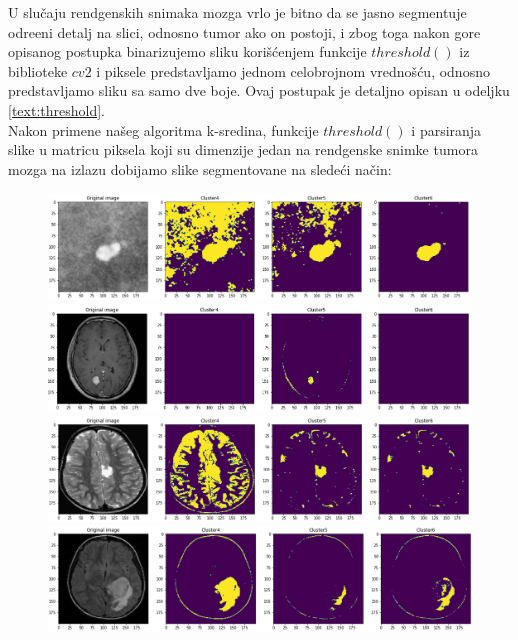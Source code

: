 \documentclass{article}
\begin{document}
U slu\v{c}aju rendgenskih snimaka mozga vrlo je bitno da se jasno segmentuje odre\dj eni detalj na slici, odnosno tumor ako on postoji, i zbog toga nakon gore opisanog postupka binarizujemo sliku kori\v{s}\'{c}enjem funkcije $ threshold() $ iz biblioteke $ cv2 $ i piksele predstavljamo jednom celobrojnom vredno\v{s}\'{c}u, odnosno predstavljamo sliku sa samo dve boje. Ovaj postupak je detaljno opisan u odeljku \ref{text:threshold}.\\


Nakon primene na\v{s}eg algoritma k-sredina, funkcije $ threshold() $ i parsiranja slike u matricu piksela koji su dimenzije jedan na rendgenske snimke tumora mozga na izlazu dobijamo slike segmentovane na slede\'{c}i na\v{c}in:

\newpage

\begin{figure}[h!]
\centerline{\includegraphics[scale=0.45]{images/segmented_k_means_tumor0.png}}
\centerline{\includegraphics[scale=0.45]{images/segmented_k_means_tumor1.png}}
\centerline{\includegraphics[scale=0.45]{images/segmented_k_means_tumor2.png}}
\centerline{\includegraphics[scale=0.45]{images/segmented_k_means_tumor3.png}}
\end{figure}
\end{document}
